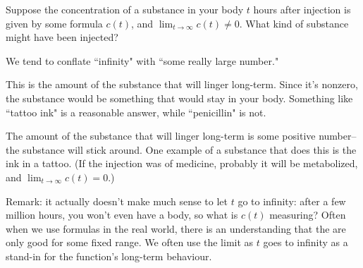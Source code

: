 \begin{question}Suppose the concentration of a substance in your body $t$ hours after injection is given by some formula $c(t)$, and $\displaystyle\lim_{t \rightarrow \infty} c(t) \neq 0$. What kind of substance might have been injected?
\end{question}
\begin{hint} We tend to conflate ``infinity" with ``some really large number."
\end{hint}
\begin{answer} This is the amount of the substance that will linger long-term. Since it's nonzero, the substance would be something that would stay in your body. Something like ``tattoo ink" is a reasonable answer, while ``penicillin" is not.
\end{answer}
\begin{solution}
The amount of the substance that will linger long-term is some positive number--the substance will stick around. One example of a substance that does this is the ink in a tattoo. (If the injection was of medicine, probably it will be metabolized, and $\displaystyle\lim_{t \rightarrow \infty} c(t)=0$.)

Remark: it actually doesn't make much sense to let $t$ go to infinity: after a few million hours,  you won't even have a body, so what is $c(t)$ measuring? Often when we use formulas in the real world, there is an understanding that the are only good for some fixed range. We often use the limit as $t$ goes to infinity as a stand-in for the function's long-term behaviour.
\end{solution}
